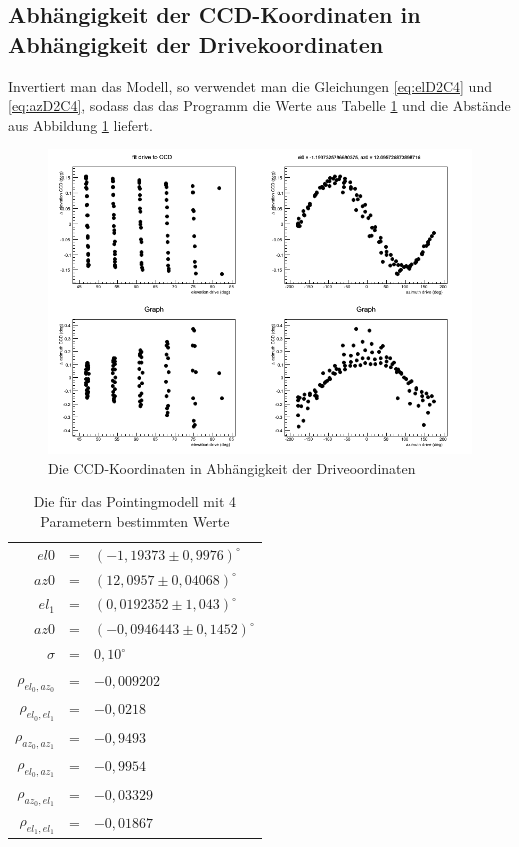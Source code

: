 \subsection{Abhängigkeit der CCD-Koordinaten in Abhängigkeit der Drivekoordinaten}
Invertiert man das Modell, so verwendet man die Gleichungen \ref{eq:elD2C4} und \ref{eq:azD2C4}, sodass das das Programm die Werte aus Tabelle \ref{tab:D2C4} und die Abstände aus Abbildung \ref{img:D2C4} liefert.
\begin{figure}[htbp]
\centering
\includegraphics[width=\textwidth]{../341/run341D2C4.png}
\caption{Die CCD-Koordinaten in Abhängigkeit der Driveoordinaten}
\label{img:D2C4}
\end{figure}
\begin{table}[htbp]
\centering
\begin{tabular}{rcl}
\toprule
$el0$ &=& $(-1,19373\pm 0,9976)^{\circ}$\\
$az0$ &=& $(12,0957\pm0,04068)^{\circ}$\\
$el_1$ &=& $(0,0192352\pm 1,043)^{\circ}$\\
$az0$ &=& $(-0,0946443\pm0,1452)^{\circ}$\\
$\sigma$ &=& $0,10^{\circ}$\\
$\rho_{el_0,az_0}$&=& $-0,009202$\\
$\rho_{el_0,el_1}$&=& $-0,0218$\\
$\rho_{az_0,az_1}$&=& $-0,9493$\\
$\rho_{el_0,az_1}$&=& $-0,9954$\\
$\rho_{az_0,el_1}$&=& $-0,03329$\\
$\rho_{el_1,el_1}$&=& $-0,01867$\\
\bottomrule
\end{tabular}
\label{tab:D2C4}
\caption{Die für das Pointingmodell mit 4 Parametern bestimmten Werte}
\end{table}

